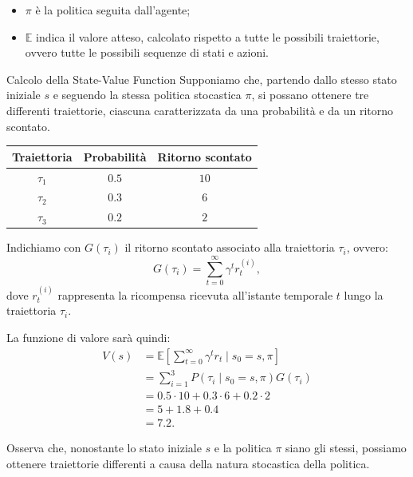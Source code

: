 \begin{itemize}
\begin{itemize}
        \item $\pi$ è la politica seguita dall'agente;

        \item $\mathbb{E}$ indica il valore atteso, calcolato 
        rispetto a tutte le possibili traiettorie, ovvero 
        tutte le possibili sequenze di stati e azioni.
    \end{itemize}
    \begin{example}{Calcolo della State-Value Function}
    Supponiamo che, partendo dallo stesso stato iniziale $s$
    e seguendo la stessa politica stocastica $\pi$, si possano
    ottenere tre differenti traiettorie, ciascuna caratterizzata
    da una probabilità e da un ritorno scontato.

    \begin{center}
        \begin{tabular}{c|c|c}
            \hline
            \textbf{Traiettoria} & \textbf{Probabilità} &
            \textbf{Ritorno scontato} \\
            \hline
            $\tau_1$ & $0.5$ & $10$ \\
            $\tau_2$ & $0.3$ & $6$  \\
            $\tau_3$ & $0.2$ & $2$  \\
            \hline
        \end{tabular}
    \end{center}

    Indichiamo con $G(\tau_i)$ il ritorno scontato associato
    alla traiettoria $\tau_i$, ovvero:
    \[
        G(\tau_i)=\sum_{t=0}^{\infty}\gamma^t r_t^{(i)},
    \]
    dove $r_t^{(i)}$ rappresenta la ricompensa ricevuta
    all'istante temporale $t$ lungo la traiettoria $\tau_i$.

    La funzione di valore sarà quindi:
    \begin{align*}
        V(s)
        &= \mathbb{E}[\sum_{t=0}^{\infty}\gamma^t r_t \mid s_0=s,\pi] \\
        &= \sum_{i=1}^{3}
        P(\tau_i\mid s_0=s, \pi)G(\tau_i) \\
        &= 0.5 \cdot 10 + 0.3 \cdot 6 + 0.2 \cdot 2 \\
        &= 5+1.8+0.4 \\
        &= 7.2.
    \end{align*}

    Osserva che, nonostante lo stato iniziale $s$ e la politica
    $\pi$ siano gli stessi, possiamo ottenere traiettorie
    differenti a causa della natura stocastica della politica.


\end{example}
\end{itemize}
